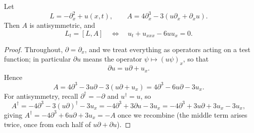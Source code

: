 \begin{proposition}
	Let
	$$
	L = -\partial_x^2 + u(x,t), \qquad A = 4\partial_x^3 - 3\left(u\partial_x + \partial_x u\right).
	$$
	Then $A$ is antisymmetric, and
	$$
	L_t = [L,A] \quad\Longleftrightarrow\quad u_t + u_{xxx} - 6uu_x = 0.
	$$
\end{proposition}
\begin{proof}
	Throughout, $\partial = \partial_x$, and we treat everything as operators acting on a test function; in particular $\partial u$ means the operator $\psi\mapsto (u\psi)_x$, so that
	$$
	\partial u = u\partial + u_x.
	$$
	Hence
	$$
	A = 4\partial^3 - 3u\partial - 3\left(u\partial + u_x\right) = 4\partial^3 - 6u\partial - 3u_x.
	$$
	For antisymmetry, recall $\partial^\dagger = -\partial$ and $u^\dagger = u$, so
	$$
	A^\dagger = -4\partial^3 - 3\left(u\partial\right)^\dagger - 3u_x = -4\partial^3 + 3\partial u - 3u_x = -4\partial^3 + 3u\partial + 3u_x - 3u_x,
	$$
	giving $A^\dagger = -4\partial^3 + 6u\partial + 3u_x = -A$ once we recombine (the middle term arises twice, once from each half of $u\partial + \partial u$).


\end{proof}
